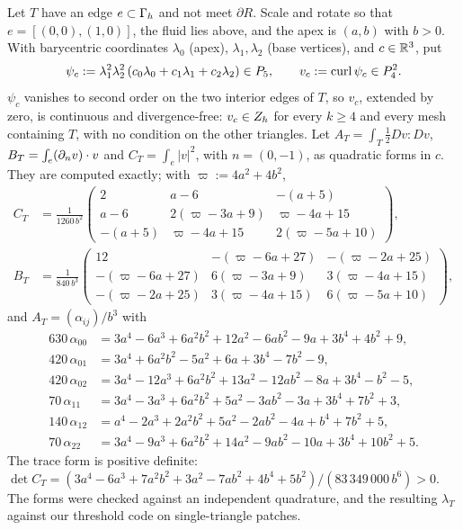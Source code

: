 Let $T$ have an edge $e\subset\Gamma_h$ and not meet $\partial R$. Scale and rotate so that $e=[(0,0),(1,0)]$, the fluid lies above, and the apex is $(a,b)$ with $b>0$. With barycentric coordinates $\lambda_0$ (apex), $\lambda_1,\lambda_2$ (base vertices), and $c\in\mathbb R^3$, put
\[
\psi_c:=\lambda_1^2\lambda_2^2\,(c_0\lambda_0+c_1\lambda_1+c_2\lambda_2)\in P_5,\qquad v_c:=\operatorname{curl}\psi_c\in P_4^2 .
\]
$\psi_c$ vanishes to second order on the two interior edges of $T$, so $v_c$, extended by zero, is continuous and divergence-free: $v_c\in Z_h$ for every $k\ge4$ and every mesh containing $T$, with no condition on the other triangles. Let $A_T=\int_T\frac12Dv:Dv$, $B_T=\int_e(\partial_n v)\cdot v$ and $C_T=\int_e|v|^2$, with $n=(0,-1)$, as quadratic forms in $c$. They are computed exactly; with $\varpi:=4a^2+4b^2$,
\begin{align*}
C_T&=\frac1{1260\,b^2}\begin{pmatrix}2&a-6&-(a+5)\\ a-6&2(\varpi-3a+9)&\varpi-4a+15\\ -(a+5)&\varpi-4a+15&2(\varpi-5a+10)\end{pmatrix},\\
B_T&=\frac1{840\,b^3}\begin{pmatrix}12&-(\varpi-6a+27)&-(\varpi-2a+25)\\ -(\varpi-6a+27)&6(\varpi-3a+9)&3(\varpi-4a+15)\\ -(\varpi-2a+25)&3(\varpi-4a+15)&6(\varpi-5a+10)\end{pmatrix},
\end{align*}
and $A_T=(\alpha_{ij})/b^3$ with
\begin{align*}
630\,\alpha_{00}&=3a^4-6a^3+6a^2b^2+12a^2-6ab^2-9a+3b^4+4b^2+9,\\
420\,\alpha_{01}&=3a^4+6a^2b^2-5a^2+6a+3b^4-7b^2-9,\\
420\,\alpha_{02}&=3a^4-12a^3+6a^2b^2+13a^2-12ab^2-8a+3b^4-b^2-5,\\
70\,\alpha_{11}&=3a^4-3a^3+6a^2b^2+5a^2-3ab^2-3a+3b^4+7b^2+3,\\
140\,\alpha_{12}&=a^4-2a^3+2a^2b^2+5a^2-2ab^2-4a+b^4+7b^2+5,\\
70\,\alpha_{22}&=3a^4-9a^3+6a^2b^2+14a^2-9ab^2-10a+3b^4+10b^2+5 .
\end{align*}
The trace form is positive definite: $\det C_T=(3a^4-6a^3+7a^2b^2+3a^2-7ab^2+4b^4+5b^2)/(83\,349\,000\,b^6)>0$. The forms were checked against an independent quadrature, and the resulting $\lambda_T$ against our threshold code on single-triangle patches.

